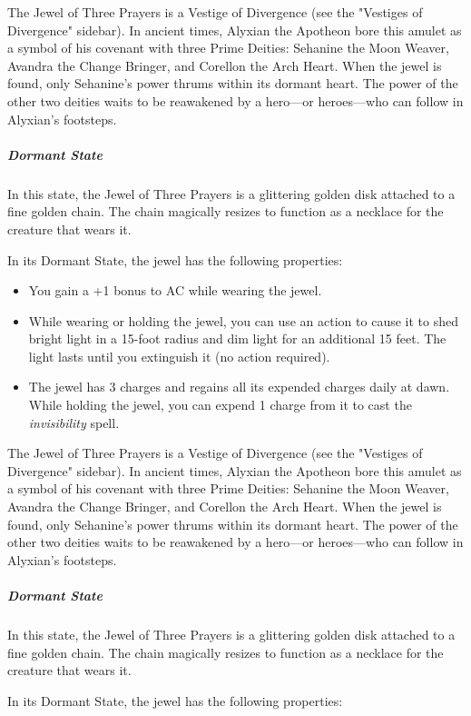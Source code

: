 \documentclass[10pt,a4paper,twoside,fancy,bg=print,twocolumn,openany,nodeprecatedcode]{dndbook}
\begin{document}
The Jewel of Three Prayers is a Vestige of Divergence (see the "Vestiges of Divergence" sidebar). In ancient times, Alyxian the Apotheon bore this amulet as a symbol of his covenant with three Prime Deities: Sehanine the Moon Weaver, Avandra the Change Bringer, and Corellon the Arch Heart. When the jewel is found, only Sehanine's power thrums within its dormant heart. The power of the other two deities waits to be reawakened by a hero—or heroes—who can follow in Alyxian's footsteps.

\subparagraph{Dormant State}
In this state, the Jewel of Three Prayers is a glittering golden disk attached to a fine golden chain. The chain magically resizes to function as a necklace for the creature that wears it.

In its Dormant State, the jewel has the following properties:


\begin{itemize}
\item You gain a +1 bonus to AC while wearing the jewel.
\item While wearing or holding the jewel, you can use an action to cause it to shed bright light in a 15-foot radius and dim light for an additional 15 feet. The light lasts until you extinguish it (no action required).
\item The jewel has 3 charges and regains all its expended charges daily at dawn. While holding the jewel, you can expend 1 charge from it to cast the \textit{invisibility} spell.
\end{itemize}

The Jewel of Three Prayers is a Vestige of Divergence (see the "Vestiges of Divergence" sidebar). In ancient times, Alyxian the Apotheon bore this amulet as a symbol of his covenant with three Prime Deities: Sehanine the Moon Weaver, Avandra the Change Bringer, and Corellon the Arch Heart. When the jewel is found, only Sehanine's power thrums within its dormant heart. The power of the other two deities waits to be reawakened by a hero—or heroes—who can follow in Alyxian's footsteps.

\subparagraph{Dormant State}
In this state, the Jewel of Three Prayers is a glittering golden disk attached to a fine golden chain. The chain magically resizes to function as a necklace for the creature that wears it.

In its Dormant State, the jewel has the following properties:
\end{document}
